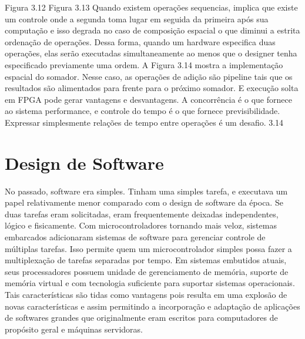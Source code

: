 Figura 3.12
Figura 3.13
Quando existem operações sequencias, implica que existe um controle onde a segunda toma lugar em seguida da primeira após sua computação e isso degrada no caso de composição espacial o que diminui a estrita ordenação de operações. Dessa forma, quando um hardware especifica duas operações, elas serão executadas simultaneamente ao menos que o designer tenha especificado previamente uma ordem. A Figura 3.14 mostra a implementação espacial do somador. Nesse caso, as operações de adição são pipeline tais que os resultados são alimentados para frente para o próximo somador. E execução solta em FPGA pode gerar vantagens e desvantagens. A concorrência é o que fornece ao sistema performance, e controle do tempo é o que fornece previsibilidade. Expressar simplesmente relações de tempo entre operações é um desafio.
3.14

\section{Design de Software}
No passado, software era simples. Tinham uma simples tarefa, e executava um papel relativamente menor comparado com o design de software da época. Se duas tarefas eram solicitadas, eram frequentemente deixadas independentes, lógico e fisicamente. Com microcontroladores tornando mais veloz, sistemas embarcados adicionaram sistemas de software para gerenciar controle de múltiplas tarefas. Isso permite quem um microcontrolador simples possa fazer a multiplexação de tarefas separadas por tempo. Em sistemas embutidos atuais, seus processadores possuem unidade de gerenciamento de memória, suporte de memória virtual e com tecnologia suficiente para suportar sistemas operacionais. Tais características são tidas como vantagens pois resulta em uma explosão de novas características e assim permitindo a incorporação e adaptação de aplicações de softwares grandes que originalmente eram escritos para computadores de propósito geral e máquinas servidoras.


